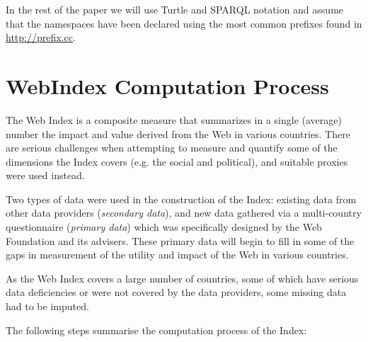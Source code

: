 \documentclass{llncs}
\begin{document}

In the rest of the paper we will use Turtle and SPARQL notation and assume that the namespaces have been declared using the most common prefixes found in
\url{http://prefix.cc}.

\section{WebIndex Computation Process}

The Web Index is a composite measure that summarizes in a single (average) number the impact and value derived from the Web in various countries. There are serious challenges when attempting to measure and quantify some of the dimensions the Index covers (e.g. the social and political), and suitable proxies were used instead.

Two types of data were used in the construction of the Index: existing data from other data providers (\emph{secondary data}), and new data gathered via a multi-country questionnaire (\emph{primary data}) 
which was specifically designed by the Web Foundation and its advisers. 
These primary data will begin to fill in some of the gaps in measurement of the utility and impact of the Web in various countries. 

As the Web Index covers a large number of countries, some of which have serious data deficiencies or were not covered by the data providers, some missing data had to be imputed.

The following steps summarise the computation process of the Index:
\end{document}
